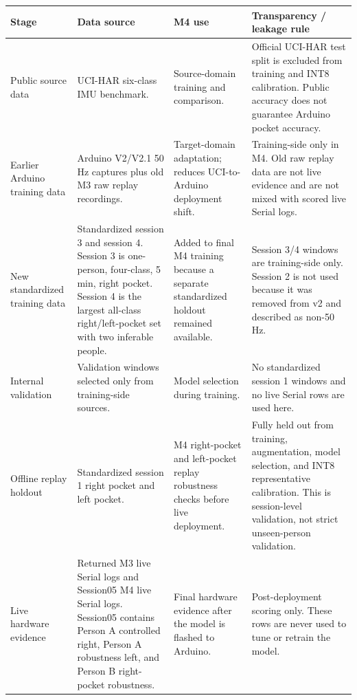 \documentclass[11pt,a4paper]{article}
\begin{document}
\begin{center}
\small
\begin{tabular}{|p{2.5cm}|p{3.6cm}|p{3.2cm}|p{4.1cm}|}
\hline
\rowcolor{headergray}
\textbf{Stage} & \textbf{Data source} & \textbf{M4 use} & \textbf{Transparency / leakage rule}\\
\hline
Public source data & UCI-HAR six-class IMU benchmark. & Source-domain training and comparison. & Official UCI-HAR test split is excluded from training and INT8 calibration. Public accuracy does not guarantee Arduino pocket accuracy.\\
\hline
Earlier Arduino training data & Arduino V2/V2.1 50 Hz captures plus old M3 raw replay recordings. & Target-domain adaptation; reduces UCI-to-Arduino deployment shift. & Training-side only in M4. Old raw replay data are not live evidence and are not mixed with scored live Serial logs.\\
\hline
New standardized training data & Standardized session 3 and session 4. Session 3 is one-person, four-class, 5 min, right pocket. Session 4 is the largest all-class right/left-pocket set with two inferable people. & Added to final M4 training because a separate standardized holdout remained available. & Session 3/4 windows are training-side only. Session 2 is not used because it was removed from v2 and described as non-50 Hz.\\
\hline
Internal validation & Validation windows selected only from training-side sources. & Model selection during training. & No standardized session 1 windows and no live Serial rows are used here.\\
\hline
Offline replay holdout & Standardized session 1 right pocket and left pocket. & M4 right-pocket and left-pocket replay robustness checks before live deployment. & Fully held out from training, augmentation, model selection, and INT8 representative calibration. This is session-level validation, not strict unseen-person validation.\\
\hline
Live hardware evidence & Returned M3 live Serial logs and Session05 M4 live Serial logs. Session05 contains Person A controlled right, Person A robustness left, and Person B right-pocket robustness. & Final hardware evidence after the model is flashed to Arduino. & Post-deployment scoring only. These rows are never used to tune or retrain the model.\\
\hline
\end{tabular}
\end{center}
\normalsize
\end{document}
